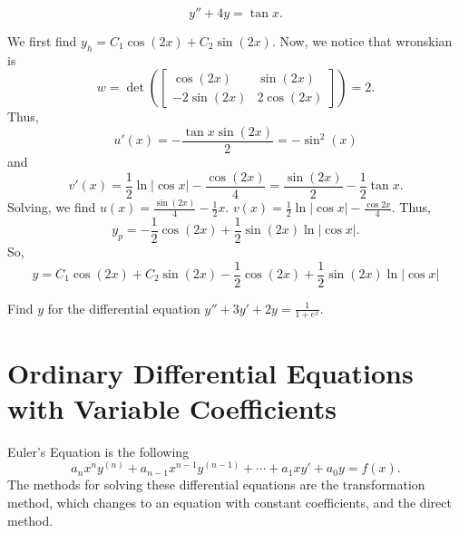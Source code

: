 \begin{example}
    $$y''+4y = \tan x.$$
\end{example}
\begin{soln}
    We first find $y_h = C_1\cos(2x)+C_2\sin(2x)$. Now, we notice that
    wronskian is 
    $$w = \det \left( \begin{bmatrix}\cos(2x)&\sin(2x) \\ -2\sin(2x) & 2\cos(2x) \end{bmatrix}\right)
    =2.$$ Thus, $$u'(x) = -\frac{\tan x \sin (2x)}{2} = -\sin^2(x)$$
    and $$v'(x) = \frac{1}{2}\ln |\cos x| - \frac{\cos(2x)}{4} = \frac{\sin(2x)}{2}-\frac{1}{2}\tan x.$$
    Solving, we find $u(x) = \frac{\sin(2x)}{4} - \frac{1}{2}x$. 
    $v(x) = \frac{1}{2}\ln |\cos x| - \frac{\cos 2x}{4}$. Thus,
    $$y_p = -\frac{1}{2}\cos(2x)+\frac{1}{2}\sin(2x)\ln |\cos x|.$$
    So, $$y = C_1\cos(2x)+C_2\sin(2x)-\frac{1}{2}\cos(2x)+\frac{1}{2}\sin(2x)\ln |\cos x|$$
\end{soln}
\begin{exercise}
    Find $y$ for the differential equation $y''+3y'+2y=\frac{1}{1+e^x}$.
\end{exercise}

\section{Ordinary Differential Equations with Variable Coefficients}
\alert{Euler's Equation} is the following
$$a_nx^ny^{(n)} + a_{n-1}x^{n-1}y^{(n-1)} + \cdots +a_1xy'+a_0y = f(x).$$
The methods for solving these differential equations are the 
\alert{transformation method}, which changes to an equation with constant
coefficients, and the \alert{direct method}.

